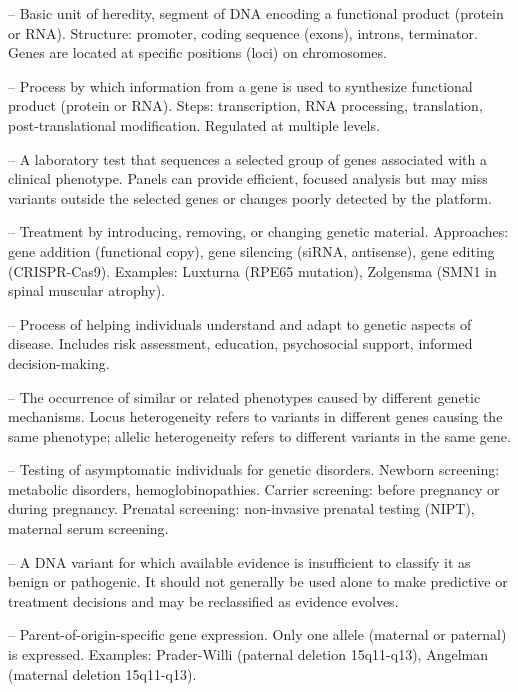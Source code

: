 -- Basic unit of heredity, segment of DNA encoding a functional product (protein or RNA). Structure: promoter, coding sequence (exons), introns, terminator. Genes are located at specific positions (loci) on chromosomes.

-- Process by which information from a gene is used to synthesize functional product (protein or RNA). Steps: transcription, RNA processing, translation, post-translational modification. Regulated at multiple levels.

-- A laboratory test that sequences a selected group of genes associated with a clinical phenotype. Panels can provide efficient, focused analysis but may miss variants outside the selected genes or changes poorly detected by the platform.

-- Treatment by introducing, removing, or changing genetic material. Approaches: gene addition (functional copy), gene silencing (siRNA, antisense), gene editing (CRISPR-Cas9). Examples: Luxturna (RPE65 mutation), Zolgensma (SMN1 in spinal muscular atrophy).

-- Process of helping individuals understand and adapt to genetic aspects of disease. Includes risk assessment, education, psychosocial support, informed decision-making.

-- The occurrence of similar or related phenotypes caused by different genetic mechanisms. Locus heterogeneity refers to variants in different genes causing the same phenotype; allelic heterogeneity refers to different variants in the same gene.

-- Testing of asymptomatic individuals for genetic disorders. Newborn screening: metabolic disorders, hemoglobinopathies. Carrier screening: before pregnancy or during pregnancy. Prenatal screening: non-invasive prenatal testing (NIPT), maternal serum screening.

-- A DNA variant for which available evidence is insufficient to classify it as benign or pathogenic. It should not generally be used alone to make predictive or treatment decisions and may be reclassified as evidence evolves.

-- Parent-of-origin-specific gene expression. Only one allele (maternal or paternal) is expressed. Examples: Prader-Willi (paternal deletion 15q11-q13), Angelman (maternal deletion 15q11-q13).

